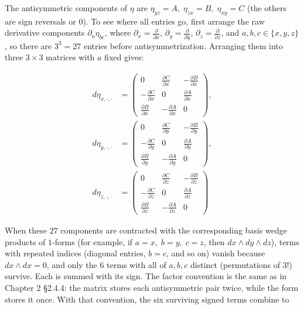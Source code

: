 \documentclass[a4paper,12pt,openany]{book}
\begin{document}
The antisymmetric components of \(\eta\) are
\(\eta_{yz}=A,\; \eta_{zx}=B,\; \eta_{xy}=C\) (the others are sign
reversals or \(0\)). To see where all entries go, first arrange the raw
derivative components \(\partial_a\eta_{bc}\), where
\(\partial_x=\frac{\partial}{\partial x}\),
\(\partial_y=\frac{\partial}{\partial y}\),
\(\partial_z=\frac{\partial}{\partial z}\), and \(a,b,c\in\{x,y,z\}\),
so there are \(3^3=27\) entries before antisymmetrization. Arranging
them into three \(3 \times 3\) matrices with \(a\) fixed gives:

\[
\begin{aligned}
d\eta_{x,\cdot,\cdot}
&= \begin{pmatrix}
0 & \frac{\partial C}{\partial x} & -\frac{\partial B}{\partial x} \\
-\frac{\partial C}{\partial x} & 0 & \frac{\partial A}{\partial x} \\
\frac{\partial B}{\partial x} & -\frac{\partial A}{\partial x} & 0
\end{pmatrix}, \\
d\eta_{y,\cdot,\cdot}
&= \begin{pmatrix}
0 & \frac{\partial C}{\partial y} & -\frac{\partial B}{\partial y} \\
-\frac{\partial C}{\partial y} & 0 & \frac{\partial A}{\partial y} \\
\frac{\partial B}{\partial y} & -\frac{\partial A}{\partial y} & 0
\end{pmatrix}, \\
d\eta_{z,\cdot,\cdot}
&= \begin{pmatrix}
0 & \frac{\partial C}{\partial z} & -\frac{\partial B}{\partial z} \\
-\frac{\partial C}{\partial z} & 0 & \frac{\partial A}{\partial z} \\
\frac{\partial B}{\partial z} & -\frac{\partial A}{\partial z} & 0
\end{pmatrix}
\end{aligned}
\]

When these \(27\) components are contracted with the corresponding basis
wedge products of \(1\)-forms (for example, if \(a=x,\;b=y,\;c=z\), then
\(dx \wedge dy \wedge dz\)), terms with repeated indices (diagonal
entries, \(b=c\), and so on) vanish because \(dx \wedge dx = 0\), and
only the \(6\) terms with all of \(a,b,c\) distinct (permutations of
\(3!\)) survive. Each is summed with its sign. The factor convention is
the same as in Chapter 2 §2.4.4: the matrix stores each antisymmetric
pair twice, while the form stores it once. With that convention, the six
surviving signed terms combine to
\end{document}
